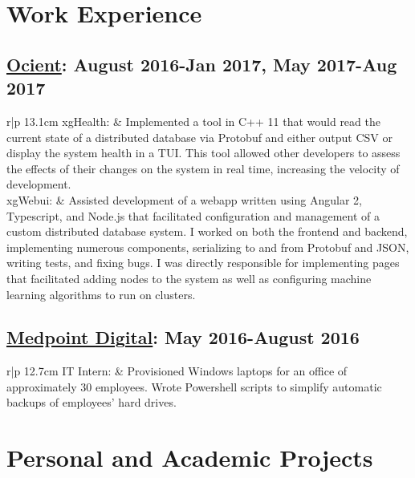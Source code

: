 \documentclass[a4paper,10pt]{article} %
\begin{document}


\section{Work Experience}

\subsection{\href{http://www.ocient.com/}{Ocient}: August 2016-Jan 2017, May 2017-Aug 2017}
\begin{tabular}{r|p {13.1cm}}
    xgHealth: & Implemented a tool in C++ 11 that would read the current state of a distributed database via Protobuf and either output CSV or display the system health in a TUI. This tool allowed other developers to assess the effects of their changes on the system in real time, increasing the velocity of development.\\ 
    xgWebui: & Assisted development of a webapp written using Angular 2, Typescript, and Node.js that facilitated configuration and management of a custom distributed database system. I worked on both the frontend and backend, implementing numerous components, serializing to and from Protobuf and JSON, writing tests, and fixing bugs.
    I was directly responsible for implementing pages that facilitated adding nodes to the system as well as configuring machine learning algorithms to run on clusters.
\end{tabular}
\subsection{\href{http://www.medpt.com/corp}{Medpoint Digital}: May 2016-August 2016}
\begin{tabular}{r|p {12.7cm}}
    IT Intern: & Provisioned Windows laptops for an office of approximately 30 employees. Wrote Powershell scripts to simplify automatic backups of employees' hard drives.
\end{tabular}

\section{Personal and Academic Projects}
\end{document}
